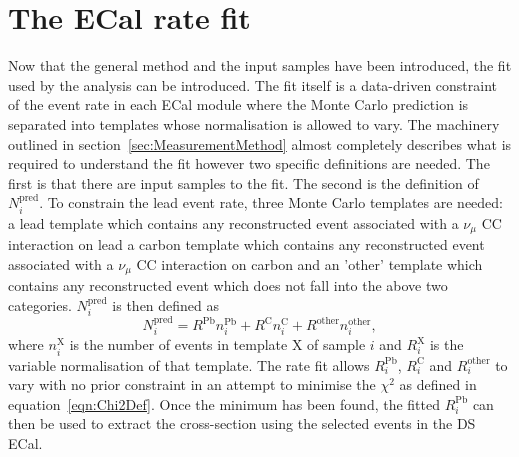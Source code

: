 \section{The ECal rate fit}
\label{sec:ECalRateFit}
Now that the general method and the input samples have been introduced, the fit used by the analysis can be introduced.  The fit itself is a data-driven constraint of the event rate in each ECal module where the Monte Carlo prediction is separated into templates whose normalisation is allowed to vary.  The machinery outlined in section~\ref{sec:MeasurementMethod} almost completely describes what is required to understand the fit however two specific definitions are needed.  The first is that there are  input samples to the fit.  The second is the definition of $N^{\textrm{pred}}_i$.  To constrain the lead event rate, three Monte Carlo templates are needed: a lead template which contains any reconstructed event associated with a $\nu_\mu$ CC interaction on lead a carbon template which contains any reconstructed event associated with a $\nu_\mu$ CC interaction on carbon and an 'other' template which contains any reconstructed event which does not fall into the above two categories.  $N^{\textrm{pred}}_i$ is then defined as 
\begin{equation}
  N^{\textrm{pred}}_i = R^{\textrm{Pb}}n^{\textrm{Pb}}_i + R^{\textrm{C}}n^{\textrm{C}}_i + R^{\textrm{other}}n^{\textrm{other}}_i,
  \label{eqn:ECalFitPredDef}
\end{equation}
where $n^{\textrm{X}}_i$ is the number of events in template X of sample $i$ and $R^{\textrm{X}}_i$ is the variable normalisation of that template.
\newline
\newline
The rate fit allows $R^{\textrm{Pb}}_i$, $R^{\textrm{C}}_i$ and $R^{\textrm{other}}_i$ to vary with no prior constraint in an attempt to minimise the $\chi^{2}$ as defined in equation~\ref{eqn:Chi2Def}.  Once the minimum has been found, the fitted $R^{\textrm{Pb}}_i$ can then be used to extract the cross-section using the selected events in the DS ECal.  
\newline
\newline
